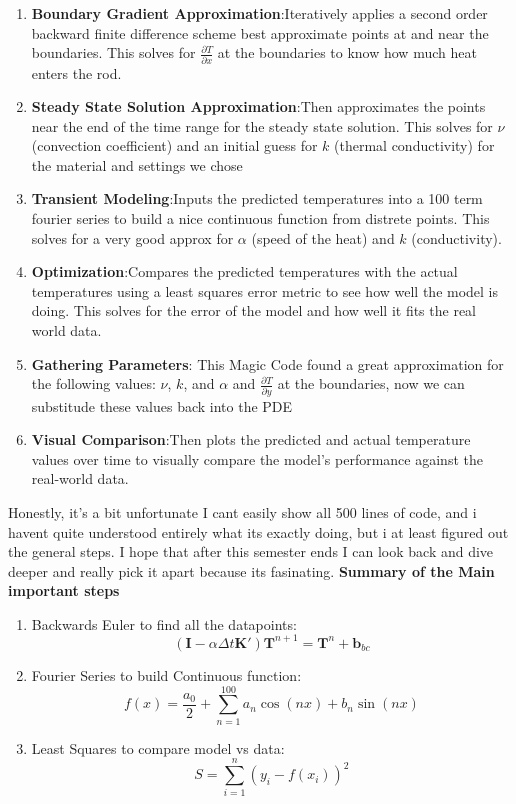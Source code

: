 \documentclass[11pt]{article}
\begin{document}
\begin{onehalfspace}
\begin{enumerate}
        \item \textbf{Boundary Gradient Approximation}:Iteratively applies a second order backward finite difference scheme best approximate points at and near the boundaries. This solves for $\frac{\partial T}{\partial x}$ at the boundaries to know how much heat enters the rod.
        \item \textbf{Steady State Solution Approximation}:Then approximates the points near the end of the time range for the steady state solution. This solves for $\nu$ (convection coefficient) and an initial guess for $k$ (thermal conductivity) for the material and settings we chose
        \item \textbf{Transient Modeling}:Inputs the predicted temperatures into a 100 term fourier series to build a nice continuous function from distrete points. This solves for a very good approx for $\alpha$ (speed of the heat) and $k$ (conductivity).
        \item \textbf{Optimization}:Compares the predicted temperatures with the actual temperatures using a least squares error metric to see how well the model is doing. This solves for the error of the model and how well it fits the real world data.
        \item \textbf{Gathering Parameters}: This Magic Code found a great approximation for the following values: $\nu$, $k$, and $\alpha$ and $\frac{\partial T}{\partial y}$ at the boundaries, now we can substitude these values back into the PDE
        \item \textbf{Visual Comparison}:Then plots the predicted and actual temperature values over time to visually compare the model's performance against the real-world data.
    \end{enumerate}
    Honestly, it's a bit unfortunate I cant easily show all 500 lines of code, 
    and i havent quite understood entirely what its exactly doing, 
    but i at least figured out the general steps. I hope that after this semester ends I can 
    look back and dive deeper and really pick it apart because its fasinating.
    \newpage
    \textbf{Summary of the Main important steps} \\
    \begin{enumerate}
        \item Backwards Euler to find all the datapoints:
            \[(\mathbf{I} - \alpha \Delta t \mathbf{K}') \mathbf{T}^{n+1} = \mathbf{T}^{n} + \mathbf{b}_{bc}\]
        \item Fourier Series to build Continuous function:
            \[f(x) = \frac{a_0}{2} + \sum_{n=1}^{100} a_n \cos(nx) + b_n \sin(nx)\]
        \item Least Squares to compare model vs data:
            \[S = \sum_{i=1}^{n} \left( y_i - f(x_i) \right)^2 \]
    \end{enumerate}
    

\end{onehalfspace}
\end{document}

